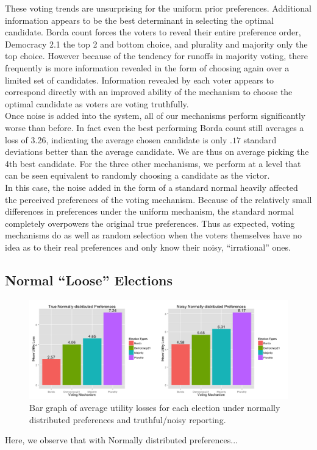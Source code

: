 \documentclass[11pt]{scrartcl}
\begin{document}
These voting trends are unsurprising for the uniform prior preferences. Additional information appears to be the best determinant in selecting the optimal candidate. Borda count forces the voters to reveal their entire preference order, Democracy 2.1 the top 2 and bottom choice, and plurality and majority only the top choice. However because of the tendency for runoffs in majority voting, there frequently is more information revealed in the form of choosing again over a limited set of candidates. Information revealed by each voter appears to correspond directly with an improved ability of the mechanism to choose the optimal candidate as voters are voting truthfully.\\

Once noise is added into the system, all of our mechanisms perform significantly worse than before. In fact even the best performing Borda count still averages a loss of 3.26, indicating the average chosen candidate is only $.17$ standard deviations better than the average candidate. We are thus on average picking the 4th best candidate. For the three other mechanisms, we perform at a level that can be seen equivalent to randomly choosing a candidate as the victor.\\

In this case, the noise added in the form of a standard normal heavily affected the perceived preferences of the voting mechanism. Because of the relatively small differences in preferences under the uniform mechanism, the standard normal completely overpowers the original true preferences. Thus as expected, voting mechanisms do as well as random selection when the voters themselves have no idea as to their real preferences and only know their noisy, ``irrational'' ones.


\subsection{Normal ``Loose'' Elections}
\begin{figure}[H]\center
\includegraphics[scale=0.38]{normal.png}
\caption{Bar graph of average utility losses for each election under normally distributed preferences and truthful/noisy reporting.}
\end{figure}
Here, we observe that with Normally distributed preferences...
\end{document}
